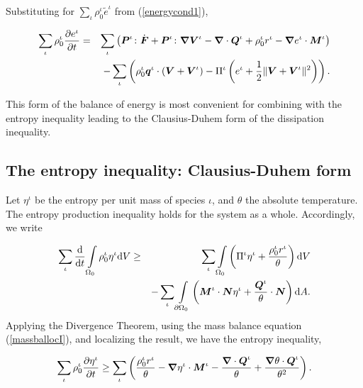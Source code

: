 \noindent Substituting for $\sum\limits_\iota
\rho^\iota_0\tilde{e}^\iota$ from (\ref{energycond1}),

\begin{eqnarray}
\sum\limits_{\iota}\rho^\iota_0\frac{\partial e^\iota}{\partial t}
&=& \sum\limits_{\iota}\left(
\mbox{\boldmath$ P$}^\iota\colon\dot{\mbox{\boldmath$ F$}}+\mbox{\boldmath$ P$}^\iota\colon\mbox{\boldmath$\nabla$}\mbox{\boldmath$ V$}^\iota -
\mbox{\boldmath$\nabla$}\cdot\mbox{\boldmath$ Q$}^\iota +\rho_0^\iota r^\iota- \mbox{\boldmath$\nabla$}
e^\iota\cdot\mbox{\boldmath$ M$}^\iota\right)\nonumber\\
&&-
\sum\limits_{\iota}\left(\rho_0^\iota\mbox{\boldmath$ q$}^\iota\cdot(\mbox{\boldmath$ V$}+\mbox{\boldmath$ V$}^\iota)
- \Pi^\iota\left(e^\iota +
\frac{1}{2}\Vert\mbox{\boldmath$ V$}+\mbox{\boldmath$ V$}^\iota\Vert^2\right)\right).
\label{energybaltot1}
\end{eqnarray}

This form of the balance of energy is most convenient for
combining with the entropy inequality leading to the
Clausius-Duhem form of the dissipation inequality.

\subsection{The entropy inequality: Clausius-Duhem form} \label{sect4.2}

Let $\eta^\iota$ be the entropy per unit mass of species $\iota$,
and $\theta$ the absolute temperature. The entropy production
inequality holds for the system as a whole. Accordingly, we write

\begin{eqnarray}
\sum\limits_{\iota}\frac{\mathrm{d}}{\mathrm{d}t}
\int\limits_{\Omega_0} \rho_0^\iota \eta^\iota \mathrm{d}V &\geq&
\sum\limits_{\iota}\int\limits_{\Omega_0}\left(
\Pi^\iota \eta^\iota + \frac{\rho_0^\iota r^\iota}{\theta}\right) \mathrm{d}V\nonumber\\
& & - \sum\limits_{\iota}\int\limits_{\partial \Omega_0}
\left(\mbox{\boldmath$ M$}^\iota \cdot \mbox{\boldmath$ N$}\eta^\iota + \frac{\mbox{\boldmath$ Q$}^\iota}{\theta}
\cdot \mbox{\boldmath$ N$} \right)\mathrm{d}A.
\end{eqnarray}
\noindent Applying the Divergence Theorem, using the mass balance
equation (\ref{massballocI}), and localizing the result, we have
the entropy inequality,

\begin{equation}
\sum\limits_{\iota}\rho_0^\iota\frac{\partial\eta^\iota}{\partial
t} \geq \sum\limits_{\iota}\left(\frac{\rho_0^\iota
r^\iota}{\theta} -\mbox{\boldmath$\nabla$}\eta^\iota\cdot\mbox{\boldmath$ M$}^\iota -
\frac{\mbox{\boldmath$\nabla$}\cdot\mbox{\boldmath$ Q$}^\iota}{\theta} +
\frac{\mbox{\boldmath$\nabla$}\theta\cdot\mbox{\boldmath$ Q$}^\iota}{\theta^2}\right).
\label{entropyineq}
\end{equation}

